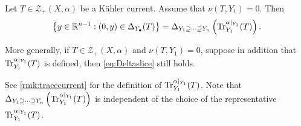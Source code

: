 \begin{lemma}\label{lma:slicepob}
    Let $T\in \mathcal{Z}_+(X,\alpha)$ be a Kähler current. Assume that $\nu(T,Y_1)=0$. Then
    \begin{equation}\label{eq:Deltaslice}
        \left\{ y\in \mathbb{R}^{n-1}: (0,y)\in \Delta_{Y_{\bullet}}(T)\right\}=\Delta_{Y_1\supseteq \cdots \supseteq Y_n}\left(\operatorname{Tr}^{\alpha|_{Y_1}}_{Y_1}(T)\right).
    \end{equation}

    More generally, if $T\in \mathcal{Z}_+(X,\alpha)$ and $\nu(T,Y_1)=0$, suppose in addition that $\operatorname{Tr}^{\alpha|_{Y_1}}_{Y_1}(T)$ is defined, then \eqref{eq:Deltaslice} still holds.
\end{lemma}
See \cref{rmk:tracecurrent} for the definition of $\operatorname{Tr}^{\alpha|_{Y_1}}_{Y_1}(T)$.
Note that $\Delta_{Y_1\supseteq \cdots \supseteq Y_n}\left(\operatorname{Tr}^{\alpha|_{Y_1}}_{Y_1}(T)\right)$ is independent of the choice of the representative $\operatorname{Tr}^{\alpha|_{Y_1}}_{Y_1}(T)$.
